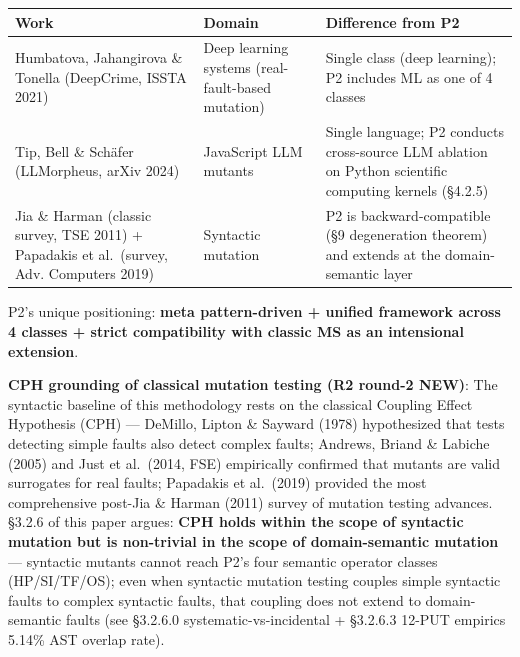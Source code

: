 \documentclass[review,12pt,authoryear]{elsarticle}
\begin{document}
{\def\LTcaptype{none} %
\begin{longtable}[]{@{}
  >{\raggedright\arraybackslash}p{}
  >{\raggedright\arraybackslash}p{}
  >{\raggedright\arraybackslash}p{}@{}}
\toprule\noalign{}
\begin{minipage}[b]{\linewidth}\raggedright
Work
\end{minipage} & \begin{minipage}[b]{\linewidth}\raggedright
Domain
\end{minipage} & \begin{minipage}[b]{\linewidth}\raggedright
Difference from P2
\end{minipage} \\
\midrule\noalign{}
\endhead
\bottomrule\noalign{}
\endlastfoot
Humbatova, Jahangirova \& Tonella (DeepCrime, ISSTA 2021) & Deep
learning systems (real-fault-based mutation) & Single class (deep
learning); P2 includes ML as one of 4 classes \\
Tip, Bell \& Schäfer (LLMorpheus, arXiv 2024) & JavaScript LLM mutants &
Single language; P2 conducts cross-source LLM ablation on Python
scientific computing kernels (§4.2.5) \\
Jia \& Harman (classic survey, TSE 2011) + Papadakis et al.~(survey,
Adv. Computers 2019) & Syntactic mutation & P2 is backward-compatible
(§9 degeneration theorem) and extends at the domain-semantic layer \\
\end{longtable}
}

P2's unique positioning: \textbf{meta pattern-driven + unified framework
across 4 classes + strict compatibility with classic MS as an
intensional extension}.

\textbf{CPH grounding of classical mutation testing (R2 round-2 NEW)}:
The syntactic baseline of this methodology rests on the classical
Coupling Effect Hypothesis (CPH) --- DeMillo, Lipton \& Sayward (1978)
hypothesized that tests detecting simple faults also detect complex
faults; Andrews, Briand \& Labiche (2005) and Just et al.~(2014, FSE)
empirically confirmed that mutants are valid surrogates for real faults;
Papadakis et al.~(2019) provided the most comprehensive post-Jia \&
Harman (2011) survey of mutation testing advances. §3.2.6 of this paper
argues: \textbf{CPH holds within the scope of syntactic mutation but is
non-trivial in the scope of domain-semantic mutation} --- syntactic
mutants cannot reach P2's four semantic operator classes (HP/SI/TF/OS);
even when syntactic mutation testing couples simple syntactic faults to
complex syntactic faults, that coupling does not extend to
domain-semantic faults (see §3.2.6.0 systematic-vs-incidental + §3.2.6.3
12-PUT empirics 5.14\% AST overlap rate).
\end{document}

